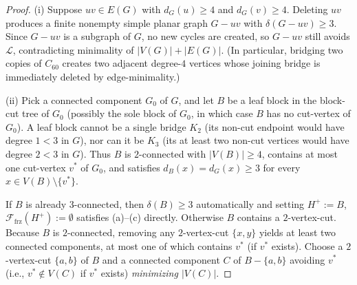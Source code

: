\documentclass[11pt,reqno]{amsart}
\theoremstyle{plain}
\theoremstyle{definition}
\theoremstyle{remark}
\newcommand{\Ffrz}{\mathcal{F}_{\mathrm{frz}}}
\DeclareRobustCommand{\_}{\ifmmode\text{\textunderscore}\else\textunderscore\allowbreak\fi}
\begin{document}
\begin{proof}
(i) Suppose $uv \in E(G)$ with $d_G(u) \ge 4$ and $d_G(v) \ge 4$. Deleting $uv$ produces a finite nonempty simple planar graph $G - uv$ with $\delta(G - uv) \ge 3$. Since $G - uv$ is a subgraph of $G$, no new cycles are created, so $G - uv$ still avoids $\mathcal{L}$, contradicting minimality of $|V(G)| + |E(G)|$. (In particular, bridging two copies of $C_{60}$ creates two adjacent degree-$4$ vertices whose joining bridge is immediately deleted by edge-minimality.)

(ii) Pick a connected component $G_0$ of $G$, and let $B$ be a leaf block in the block-cut tree of $G_0$ (possibly the sole block of $G_0$, in which case $B$ has no cut-vertex of $G_0$). A leaf block cannot be a single bridge $K_2$ (its non-cut endpoint would have degree $1 < 3$ in $G$), nor can it be $K_3$ (its at least two non-cut vertices would have degree $2 < 3$ in $G$). Thus $B$ is $2$-connected with $|V(B)| \ge 4$, contains at most one cut-vertex $v^*$ of $G_0$, and satisfies $d_B(x) = d_G(x) \ge 3$ for every $x \in V(B) \setminus \{v^*\}$.

If $B$ is already $3$-connected, then $\delta(B) \ge 3$ automatically and setting $H^+ := B$, $\Ffrz(H^+) := \emptyset$ satisfies (a)--(c) directly. Otherwise $B$ contains a $2$-vertex-cut. Because $B$ is $2$-connected, removing any $2$-vertex-cut $\{x, y\}$ yields at least two connected components, at most one of which contains $v^*$ (if $v^*$ exists). Choose a $2$-vertex-cut $\{a, b\}$ of $B$ and a connected component $C$ of $B - \{a, b\}$ avoiding $v^*$ (i.e., $v^* \notin V(C)$ if $v^*$ exists) \emph{minimizing $|V(C)|$}.


\end{proof}
\end{document}
